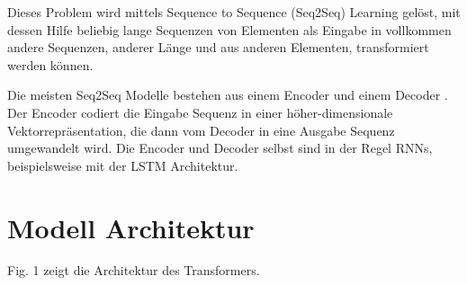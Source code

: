 \documentclass[conference]{IEEEtran}
\begin{document}
Dieses Problem wird mittels Sequence to Sequence (Seq2Seq) Learning gelöst, mit dessen Hilfe beliebig lange Sequenzen von Elementen als Eingabe in vollkommen andere Sequenzen, anderer Länge und aus anderen Elementen, transformiert werden können. \cite{sequence_to_sequence}

Die meisten Seq2Seq Modelle bestehen aus einem Encoder und einem Decoder \cite{attention_is_all_you_need}. Der Encoder codiert die Eingabe Sequenz in einer höher-dimensionale Vektorrepräsentation, die dann vom Decoder in eine Ausgabe Sequenz umgewandelt wird. Die Encoder und Decoder selbst sind in der Regel RNNs, beispielsweise mit der LSTM Architektur.


\section{Modell Architektur}
Fig. 1 zeigt die Architektur des Transformers.
\end{document}

